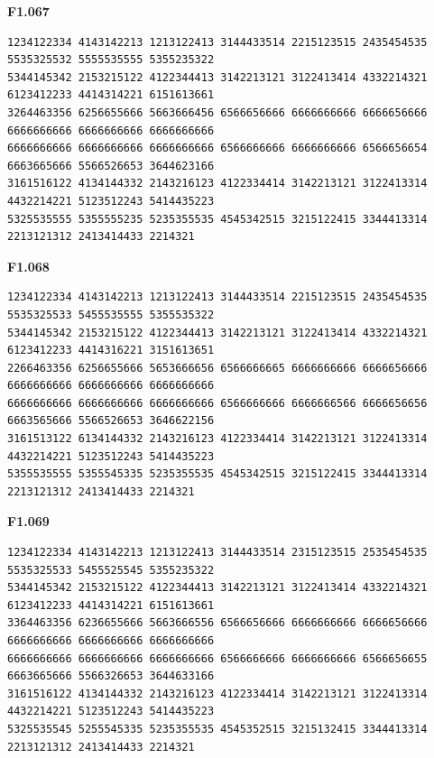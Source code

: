 \noindent\begin{minipage}{\linewidth}\textbf{F1.067}
\begin{lstlisting}
1234122334 4143142213 1213122413 3144433514 2215123515 2435454535 5535325532 5555535555 5355235322
5344145342 2153215122 4122344413 3142213121 3122413414 4332214321 6123412233 4414314221 6151613661
3264463356 6256655666 5663666456 6566656666 6666666666 6666656666 6666666666 6666666666 6666666666
6666666666 6666666666 6666666666 6566666666 6666666666 6566656654 6663665666 5566526653 3644623166
3161516122 4134144332 2143216123 4122334414 3142213121 3122413314 4432214221 5123512243 5414435223
5325535555 5355555235 5235355535 4545342515 3215122415 3344413314 2213121312 2413414433 2214321
\end{lstlisting}
\end{minipage}\par\smallskip

\noindent\begin{minipage}{\linewidth}\textbf{F1.068}
\begin{lstlisting}
1234122334 4143142213 1213122413 3144433514 2215123515 2435454535 5535325533 5455535555 5355535322
5344145342 2153215122 4122344413 3142213121 3122413414 4332214321 6123412233 4414316221 3151613651
2266463356 6256655666 5653666656 6566666665 6666666666 6666656666 6666666666 6666666666 6666666666
6666666666 6666666666 6666666666 6566666666 6666666566 6666656656 6663565666 5566526653 3646622156
3161513122 6134144332 2143216123 4122334414 3142213121 3122413314 4432214221 5123512243 5414435223
5355535555 5355545335 5235355535 4545342515 3215122415 3344413314 2213121312 2413414433 2214321
\end{lstlisting}
\end{minipage}\par\smallskip

\noindent\begin{minipage}{\linewidth}\textbf{F1.069}
\begin{lstlisting}
1234122334 4143142213 1213122413 3144433514 2315123515 2535454535 5535325533 5455525545 5355235322
5344145342 2153215122 4122344413 3142213121 3122413414 4332214321 6123412233 4414314221 6151613661
3364463356 6236655666 5663666556 6566656666 6666666666 6666656666 6666666666 6666666666 6666666666
6666666666 6666666666 6666666666 6566666666 6666666666 6566656655 6663665666 5566326653 3644633166
3161516122 4134144332 2143216123 4122334414 3142213121 3122413314 4432214221 5123512243 5414435223
5325535545 5255545335 5235355535 4545352515 3215132415 3344413314 2213121312 2413414433 2214321
\end{lstlisting}
\end{minipage}\par\smallskip


